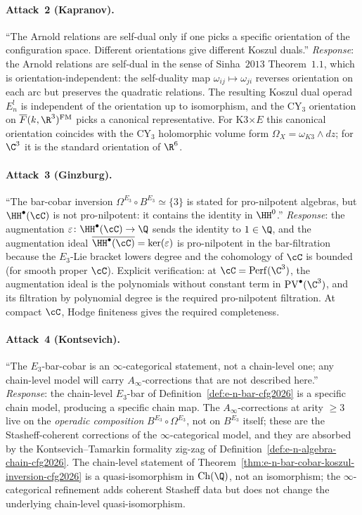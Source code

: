 \paragraph{Attack~2 (Kapranov).}
``The Arnold relations are self-dual only if one picks a specific
orientation of the configuration space. Different orientations give
different Koszul duals.''
\emph{Response}: the Arnold relations are self-dual in the sense of
Sinha~$2013$ Theorem~$1.1$, which is orientation-independent: the
self-duality map $\omega_{ij} \mapsto \omega_{ji}$ reverses orientation
on each arc but preserves the quadratic relations. The resulting Koszul
dual operad $E_n^!$ is independent of the orientation up to
isomorphism, and the CY$_3$ orientation on $\overline{F}(k, \R^3)^{\mathrm{FM}}$
picks a canonical representative. For K3$\times E$ this canonical
orientation coincides with the CY$_3$ holomorphic volume form
$\Omega_X = \omega_{K3} \wedge dz$; for $\C^3$ it is the standard
orientation of $\R^6$.

\paragraph{Attack~3 (Ginzburg).}
``The bar-cobar inversion $\Omega^{E_3} \circ B^{E_3} \simeq \{3\}$ is
stated for pro-nilpotent algebras, but $\HH^\bullet(\cC)$ is not
pro-nilpotent: it contains the identity in $\HH^0$.''
\emph{Response}: the augmentation $\varepsilon \colon \HH^\bullet(\cC) \to \Q$
sends the identity to $1 \in \Q$, and the augmentation ideal
$\overline{\HH^\bullet(\cC)} = \ker(\varepsilon)$ is pro-nilpotent in
the bar-filtration because the $E_3$-Lie bracket lowers degree and the
cohomology of $\cC$ is bounded (for smooth proper $\cC$). Explicit
verification: at $\cC = \mathrm{Perf}(\C^3)$, the augmentation ideal is
the polynomials without constant term in $\mathrm{PV}^\bullet(\C^3)$,
and its filtration by polynomial degree is the required pro-nilpotent
filtration. At compact $\cC$, Hodge finiteness gives the required
completeness.

\paragraph{Attack~4 (Kontsevich).}
``The $E_3$-bar-cobar is an $\infty$-categorical statement, not a
chain-level one; any chain-level model will carry $A_\infty$-corrections
that are not described here.''
\emph{Response}: the chain-level $E_3$-bar of
Definition~\textup{\ref{def:e-n-bar-cfg2026}} is a specific chain
model, producing a specific chain map. The $A_\infty$-corrections at
arity $\geq 3$ live on the \emph{operadic composition}
$B^{E_3} \circ \Omega^{E_3}$, not on $B^{E_3}$ itself; these are the
Stasheff-coherent corrections of the $\infty$-categorical model, and
they are absorbed by the Kontsevich--Tamarkin formality zig-zag of
Definition~\textup{\ref{def:e-n-algebra-chain-cfg2026}}. The
chain-level statement of
Theorem~\textup{\ref{thm:e-n-bar-cobar-koszul-inversion-cfg2026}} is a
quasi-isomorphism in $\mathrm{Ch}(\Q)$, not an isomorphism; the
$\infty$-categorical refinement adds coherent Stasheff data but does
not change the underlying chain-level quasi-isomorphism.

